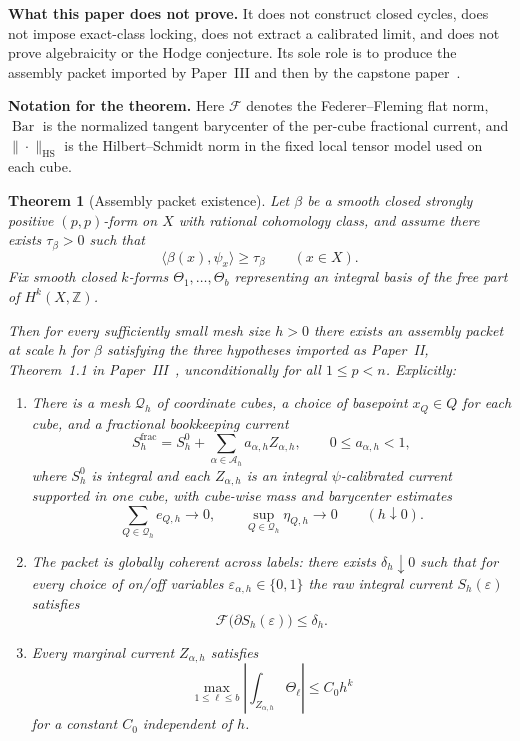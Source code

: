 \documentclass[11pt]{article}
\numberwithin{equation}{section}
\theoremstyle{plain}
\newtheorem{theorem}{Theorem}[section]
\theoremstyle{definition}
\theoremstyle{remark}
\DeclareMathOperator{\HS}{HS}
\newcommand{\Z}{\mathbb{Z}}
\newcommand{\calQ}{\mathcal{Q}}
\newcommand{\calA}{\mathcal{A}}
\newcommand{\calF}{\mathcal{F}}
\newcommand{\Bary}{\operatorname{Bar}}
\begin{document}
\noindent\textbf{What this paper does not prove.}
It does not construct closed cycles, does not impose exact-class locking, does not extract a calibrated limit, and does not prove algebraicity or the Hodge conjecture.  Its sole role is to produce the assembly packet imported by Paper~III and then by the capstone paper~\cite{Washburn26IV}.

\medskip

\noindent\textbf{Notation for the theorem.}
Here $\calF$ denotes the Federer--Fleming flat norm, $\Bary$ is the normalized tangent barycenter of the per-cube fractional current, and $\|\cdot\|_{\HS}$ is the Hilbert--Schmidt norm in the fixed local tensor model used on each cube.

\begin{theorem}[Assembly packet existence]\label{thm:main}
Let $\beta$ be a smooth closed strongly positive $(p,p)$-form on $X$ with rational cohomology class, and assume there exists $\tau_\beta>0$ such that
\[
\langle\beta(x),\psi_x\rangle\ge \tau_\beta
\qquad (x\in X).
\]
Fix smooth closed $k$-forms $\Theta_1,\dots,\Theta_b$ representing an integral basis of the free part of $H^k(X,\Z)$.

Then for every sufficiently small mesh size $h>0$ there exists an assembly packet at scale $h$ for $\beta$ satisfying the three hypotheses imported as Paper~II, Theorem~1.1 in Paper~III~\cite[Thm.~1.1]{Washburn26III}, unconditionally for all $1\le p<n$.  Explicitly:
\begin{enumerate}
\item[\textnormal{(A1)}] There is a mesh $\calQ_h$ of coordinate cubes, a choice of basepoint $x_Q\in Q$ for each cube, and a fractional bookkeeping current
\[
S_h^{\mathrm{frac}}=S_h^0+\sum_{\alpha\in\calA_h} a_{\alpha,h} Z_{\alpha,h},
\qquad
0\le a_{\alpha,h}<1,
\]
where $S_h^0$ is integral and each $Z_{\alpha,h}$ is an integral $\psi$-calibrated current supported in one cube, with cube-wise mass and barycenter estimates
\[
\sum_{Q\in\calQ_h} e_{Q,h}\longrightarrow 0,
\qquad
\sup_{Q\in\calQ_h}\eta_{Q,h}\longrightarrow 0
\qquad (h\downarrow 0).
\]

\item[\textnormal{(A2)}] The packet is globally coherent across labels: there exists $\delta_h\downarrow 0$ such that for every choice of on/off variables $\varepsilon_{\alpha,h}\in\{0,1\}$ the raw integral current $S_h(\varepsilon)$ satisfies
\[
\calF\bigl(\partial S_h(\varepsilon)\bigr)\le \delta_h.
\]

\item[\textnormal{(A3)}] Every marginal current $Z_{\alpha,h}$ satisfies
\[
\max_{1\le \ell\le b}\left|\int_{Z_{\alpha,h}}\Theta_\ell\right|\le C_0 h^k
\]
for a constant $C_0$ independent of $h$.
\end{enumerate}
\end{theorem}
\end{document}
